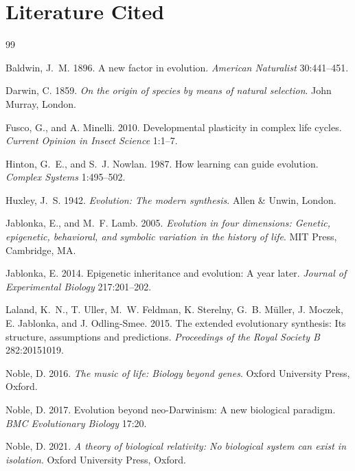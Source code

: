 \documentclass[11pt]{article}
\begin{document}
\newpage{}

\section*{Literature Cited}

\begin{thebibliography}{99}

Baldwin, J.~M. 1896. A new factor in evolution. \textit{American Naturalist} 30:441--451.

Darwin, C. 1859. \textit{On the origin of species by means of natural selection}. John Murray, London.

Fusco, G., and A. Minelli. 2010. Developmental plasticity in complex life cycles. \textit{Current Opinion in Insect Science} 1:1--7.

Hinton, G.~E., and S.~J. Nowlan. 1987. How learning can guide evolution. \textit{Complex Systems} 1:495--502.

Huxley, J.~S. 1942. \textit{Evolution: The modern synthesis}. Allen \& Unwin, London.

Jablonka, E., and M.~F. Lamb. 2005. \textit{Evolution in four dimensions: Genetic, epigenetic, behavioral, and symbolic variation in the history of life}. MIT Press, Cambridge, MA.

Jablonka, E. 2014. Epigenetic inheritance and evolution: A year later. \textit{Journal of Experimental Biology} 217:201--202.

Laland, K.~N., T. Uller, M.~W. Feldman, K. Sterelny, G.~B. M\"{u}ller, J. Moczek, E. Jablonka, and J. Odling-Smee. 2015. The extended evolutionary synthesis: Its structure, assumptions and predictions. \textit{Proceedings of the Royal Society B} 282:20151019.

Noble, D. 2016. \textit{The music of life: Biology beyond genes}. Oxford University Press, Oxford.

Noble, D. 2017. Evolution beyond neo-Darwinism: A new biological paradigm. \textit{BMC Evolutionary Biology} 17:20.

Noble, D. 2021. \textit{A theory of biological relativity: No biological system can exist in isolation}. Oxford University Press, Oxford.


\end{thebibliography}
\end{document}
